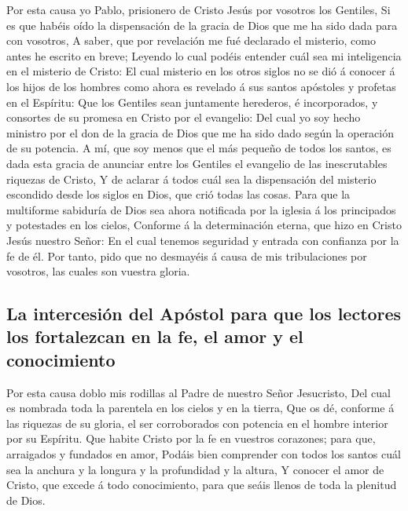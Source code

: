  Por esta causa yo Pablo, prisionero de Cristo Jesús por
vosotros los Gentiles,  Si es que habéis oído la
dispensación de la gracia de Dios que me ha sido dada para con vosotros,
 A saber, que por revelación me fué declarado el misterio,
como antes he escrito en breve;  Leyendo lo cual podéis
entender cuál sea mi inteligencia en el misterio de Cristo:
 El cual misterio en los otros siglos no se dió á conocer
á los hijos de los hombres como ahora es revelado á sus santos apóstoles
y profetas en el Espíritu:  Que los Gentiles sean
juntamente herederos, é incorporados, y consortes de su promesa en
Cristo por el evangelio:  Del cual yo soy hecho ministro
por el don de la gracia de Dios que me ha sido dado según la operación
de su potencia.  A mí, que soy menos que el más pequeño de
todos los santos, es dada esta gracia de anunciar entre los Gentiles el
evangelio de las inescrutables riquezas de Cristo,  Y de
aclarar á todos cuál sea la dispensación del misterio escondido desde
los siglos en Dios, que crió todas las cosas.  Para que
la multiforme sabiduría de Dios sea ahora notificada por la iglesia á
los principados y potestades en los cielos,  Conforme á
la determinación eterna, que hizo en Cristo Jesús nuestro Señor:
 En el cual tenemos seguridad y entrada con confianza por
la fe de él.  Por tanto, pido que no desmayéis á causa de
mis tribulaciones por vosotros, las cuales son vuestra gloria.

\hypertarget{la-intercesiuxf3n-del-apuxf3stol-para-que-los-lectores-los-fortalezcan-en-la-fe-el-amor-y-el-conocimiento}{%
\subsection{La intercesión del Apóstol para que los lectores los
fortalezcan en la fe, el amor y el
conocimiento}\label{la-intercesiuxf3n-del-apuxf3stol-para-que-los-lectores-los-fortalezcan-en-la-fe-el-amor-y-el-conocimiento}}

 Por esta causa doblo mis rodillas al Padre de nuestro
Señor Jesucristo,  Del cual es nombrada toda la parentela
en los cielos y en la tierra,  Que os dé, conforme á las
riquezas de su gloria, el ser corroborados con potencia en el hombre
interior por su Espíritu.  Que habite Cristo por la fe en
vuestros corazones; para que, arraigados y fundados en amor,
 Podáis bien comprender con todos los santos cuál sea la
anchura y la longura y la profundidad y la altura,  Y
conocer el amor de Cristo, que excede á todo conocimiento, para que
seáis llenos de toda la plenitud de Dios.

